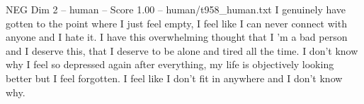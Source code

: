 \begin{textsample}{NEG Dim 2 – human – Score 1.00 – human/t958\_human.txt}  \label{ex:f2_neg_030}
I genuinely have gotten to the point where I just feel empty, I feel like I can never connect with anyone and I hate it.
I have this overwhelming thought that I ’m a bad person and I deserve this, that I deserve to be alone and tired all the time.
I don't know why I feel so depressed again after everything, my life is objectively looking better but I feel forgotten.
I feel like I don't fit in anywhere and I don't know why.

\end{textsample}
